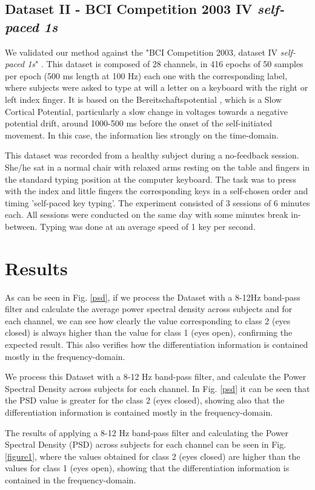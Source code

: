 \subsection{Dataset II - BCI Competition 2003 IV \textit{self-paced 1s}}
We validated our method against the "BCI Competition 2003, dataset IV \textit{self-paced 1s}" \cite{c51}. This dataset is composed of 28 channels, in 416 epochs of 50 samples per epoch (500 ms length at 100 Hz) each one with the corresponding label, where subjects were asked to type at will a letter on a keyboard with the right or left index finger.  It is based on the Bereitschaftspotential \cite{c52}, which is a Slow Cortical Potential, particularly a slow change in voltages towards a negative potential drift, around 1000-500 ms before the onset of the self-initiated movement.  In this case, the information lies strongly on the time-domain.

This dataset was recorded from a healthy subject during a no-feedback session. She/he sat in a normal chair with relaxed arms resting on the table and fingers in the standard typing position at the computer keyboard. The task was to press with the index and little fingers the corresponding keys in a self-chosen order and timing 'self-paced key typing'. The experiment consisted of 3 sessions of 6 minutes each. All sessions were conducted on the same day with some minutes break in-between. Typing was done at an average speed of 1 key per second.  

\section{Results}

As can be seen in Fig. \ref{psd}, if we process the Dataset with a 8-12Hz band-pass filter and calculate the average power spectral density across subjects and for each channel, we can see how clearly the value corresponding to class 2 (eyes closed) is always higher than the value for class 1 (eyes open), confirming the expected result.  This also verifies how the differentiation information is contained mostly in the frequency-domain.

We process this Dataset with a 8-12 Hz band-pass filter, and calculate the Power Spectral Density across subjects for each channel.  In Fig. \ref{psd} it can be seen that the PSD value is greater for the class 2 (eyes closed), showing also that the differentiation information is contained mostly in the frequency-domain.

The results of applying a 8-12 Hz band-pass filter and calculating the Power Spectral Density (PSD) across subjects for each channel can be seen in Fig. \ref{figure1}, where the values obtained for class 2 (eyes closed) are higher than the values for class 1 (eyes open), showing that the differentiation information is contained in the frequency-domain.

